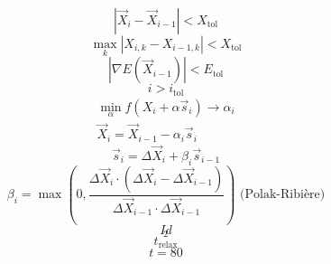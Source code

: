 \documentclass{scrreprt}
\begin{document}
\begin{equation}
|\vec X_i - \vec X_{i-1}| < X_\text{tol}
\end{equation}
\begin{equation}
\max_k{|X_{i,k} - X_{i-1,k}|} < X_\text{tol}
\end{equation}
\begin{equation}
|\nabla E(\vec X_{i-1})| < E_\text{tol}
\end{equation}
\begin{equation}
i > i_\text{tol}
\end{equation}
\begin{gather}
  \label{eq:cg-linesearch1}
  \min_\alpha f(X_i+\alpha \vec s_i) \rightarrow \alpha_i \\
  \label{eq:cg-linesearch2}
  \vec X_i = \vec X_{i-1} - \alpha_i \vec s_i
\end{gather}
\begin{equation}
  \label{eq:pr1}
  \vec s_i = \Delta \vec X_i + \beta_i \vec s_{i-1}
\end{equation}
\begin{equation}
  \label{eq:pr2}
  \beta_i = \max \left(0, \frac{\Delta \vec X_i \cdot \left(\Delta \vec X_i - \Delta \vec X_{i-1}\right)}{\Delta \vec X_{i-1} \cdot \Delta \vec X_{i-1}}\right) \text{~(Polak-Ribière)}
\end{equation}
\begin{equation}
Id
\end{equation}
\begin{equation}
_2
\end{equation}
\begin{equation}
t_\text{relax}
\end{equation}
\begin{equation}
\end{equation}
\begin{equation}
t=80
\end{equation}
\end{document}
